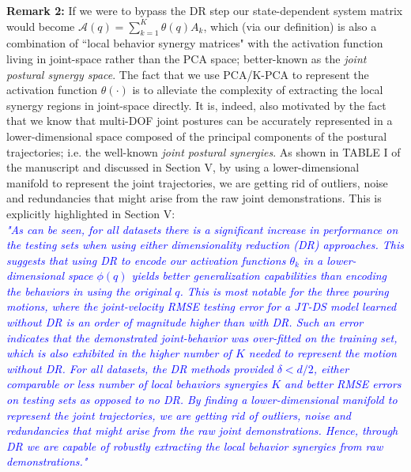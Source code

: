 \documentclass{article}
\begin{document}
\begin{enumerate}
\noindent \textbf{Remark 2:} If we were to bypass the DR step our state-dependent system matrix would become $\mathcal{A}(q)= \sum\limits_{k=1}^{K}\theta(q)A_k$, which (via our definition) is also a combination of ``local behavior synergy matrices" with the activation function living in joint-space rather than the PCA space; better-known as the \textit{joint postural synergy space}. The fact that we use PCA/K-PCA to represent the activation function $\theta(\cdot)$ is to alleviate the complexity of extracting the local synergy regions in joint-space directly. It is, indeed, also motivated by the fact that we know that multi-DOF joint postures can be accurately represented in a lower-dimensional space composed of the principal components of the postural trajectories; i.e. the well-known \textit{joint postural synergies}. As shown in TABLE I of the manuscript and discussed in Section V, by using a lower-dimensional manifold to represent the joint trajectories, we are getting rid of outliers, noise and redundancies that might arise from the raw joint demonstrations. This is explicitly highlighted in Section V:\\
\textcolor{blue}{\small \textit{"As can be seen, for all datasets there is a significant increase in performance on the testing sets when using either dimensionality reduction (DR) approaches. This suggests that using DR to encode our activation functions $\theta_k$ in a lower-dimensional space $\phi(q)$ yields better generalization capabilities than encoding the behaviors in using the original $q$. This is most notable for the three pouring motions, where the joint-velocity RMSE testing error for a JT-DS model learned without DR is an order of magnitude higher than with DR. Such an error indicates that the demonstrated joint-behavior was over-fitted on the training set, which is also exhibited in the higher number of $K$ needed to represent the motion without DR. For all datasets, the DR methods provided $\delta < d/2$, either comparable or less number of local behaviors synergies $K$ and better RMSE errors on testing sets as opposed to no DR. By finding a lower-dimensional manifold to represent the joint trajectories, we are getting rid of outliers, noise and redundancies that might arise from the raw joint demonstrations. Hence, through DR we are capable of robustly extracting the local behavior synergies from raw demonstrations."}} \\


\end{enumerate}
\end{document}
